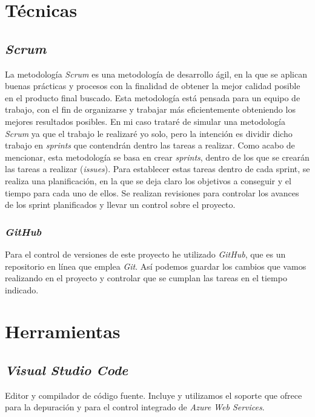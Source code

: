 
\section{Técnicas}

\subsection{\textit{Scrum}}
La metodología \textit{Scrum} es una metodología de desarrollo ágil, en la que se aplican buenas prácticas y procesos con la finalidad de obtener la mejor calidad posible en el producto final buscado.\newline
Esta metodología está pensada para un equipo de trabajo, con el fin de organizarse y trabajar más eficientemente obteniendo los mejores resultados posibles. En mi caso trataré de simular una metodología \textit{Scrum} ya que el trabajo le realizaré yo solo, pero la intención es dividir dicho trabajo en \textit{sprints} que contendrán dentro las tareas a realizar.\newline
Como acabo de mencionar, esta metodología se basa en crear \textit{sprints}, dentro de los que se crearán las tareas a realizar (\textit{issues}). Para establecer estas tareas dentro de cada sprint, se realiza una planificación, en la que se deja claro los objetivos a conseguir y el tiempo para cada uno de ellos. 
Se realizan revisiones para controlar los avances de los sprint planificados y llevar un control sobre el proyecto.

\subsubsection{\textit{GitHub}}
Para el control de versiones de este proyecto he utilizado \textit{GitHub}, que es un repositorio en línea que emplea \textit{Git}. Así podemos guardar los cambios que vamos realizando en el proyecto y controlar que se cumplan las tareas en el tiempo indicado.

\section{Herramientas}
\subsection{\textit{Visual Studio Code}}
Editor y compilador de código fuente. Incluye y utilizamos el soporte que ofrece para la depuración y para el control integrado de \textit{Azure Web Services}.

